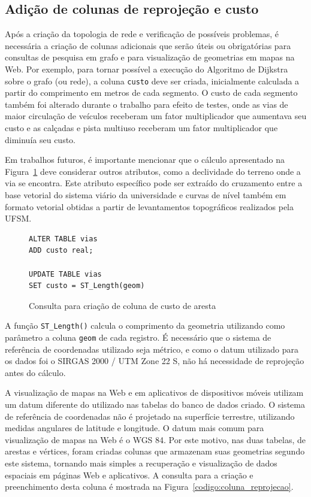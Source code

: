\documentclass[oneside,openright,12pt]{ufsm_2015} %
\begin{document}
\subsection{Adição de colunas de reprojeção e custo}


Após a criação da topologia de rede e verificação de possíveis problemas, é necessária a criação de  colunas adicionais que serão úteis ou obrigatórias para consultas de pesquisa em grafo e para visualização de geometrias em mapas na Web.
Por exemplo, para tornar possível a execução do Algoritmo de Dijkstra sobre o grafo (ou rede), a coluna {\tt custo} deve ser criada, inicialmente calculada a partir do comprimento em metros de cada segmento.  
O custo de cada segmento também foi alterado durante o trabalho para efeito de testes, onde as vias de maior circulação de veículos receberam um fator multiplicador que aumentava seu custo e as calçadas e pista multiuso receberam um fator multiplicador que diminuía seu custo.

Em trabalhos futuros, é importante mencionar que o cálculo apresentado na Figura~\ref{codigo:coluna_custo} deve  considerar outros atributos, como a declividade do terreno onde a via se encontra. 
Este atributo específico pode ser extraído do cruzamento entre a base vetorial do sistema viário da universidade e curvas de nível também em formato vetorial obtidas a partir de levantamentos topográficos realizados pela UFSM.

\begin{figure}[h!]
    \centering
        \caption{Consulta para criação de coluna de custo de aresta}
    \label{codigo:coluna_custo}
\begin{lstlisting}[]
ALTER TABLE vias
ADD custo real;

UPDATE TABLE vias
SET custo = ST_Length(geom)
\end{lstlisting}
\end{figure}


A função  {\tt ST\_Length()} calcula o comprimento da geometria utilizando como parâmetro a coluna {\tt geom} de cada registro. 
É necessário que o sistema de referência de coordenadas utilizado seja métrico, e como o datum utilizado para os dados foi o SIRGAS 2000 / UTM Zone 22 S, não há necessidade de reprojeção antes do cálculo.

A visualização de mapas na Web e em aplicativos de dispositivos móveis utilizam um datum diferente do utilizado nas tabelas do banco de dados criado. 
O sistema de referência de coordenadas não é projetado na superfície terrestre, utilizando medidas angulares de latitude e longitude. O datum mais comum para visualização de mapas na Web é o WGS 84. 
Por este motivo, nas duas tabelas, de arestas e vértices, foram criadas colunas que armazenam suas geometrias segundo este sistema, tornando mais simples a recuperação e visualização de dados espaciais em páginas Web e aplicativos. 
A consulta para a criação e preenchimento desta coluna é mostrada na Figura~\ref{codigo:coluna_reprojecao}.
\end{document}
